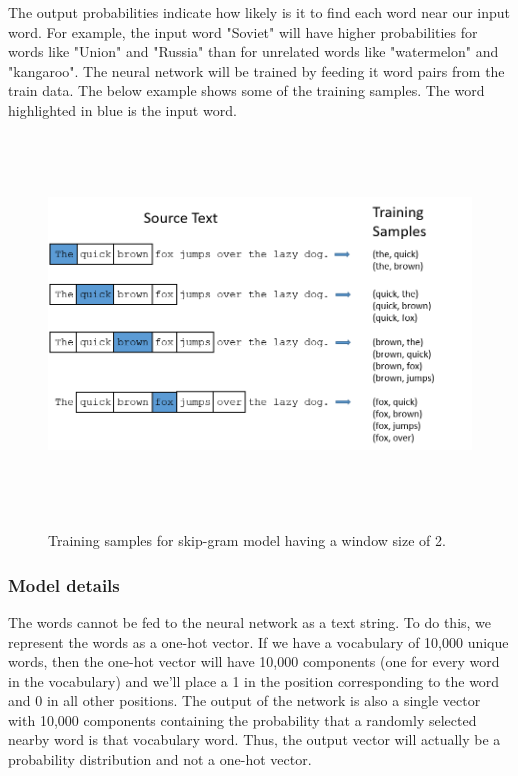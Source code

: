 The output probabilities indicate how likely is it to find each word near our input word. For example, the input word "Soviet" will have higher probabilities for words like "Union" and "Russia" than for unrelated words like "watermelon" and "kangaroo". The neural network will be trained by feeding it word pairs from the train data. The below example shows some of the training samples. The word highlighted in blue is the input word.

\begin{figure}[htbp]
\centering
\includegraphics[width=16cm, height=10cm]{images/training_data.png}\\
\centering
\caption{Training samples for skip-gram model having a window size of 2.}
\label{fig:foo}
\end{figure}

\newpage
\subsubsection{Model details}

The words cannot be fed to the neural network as a text string. To do this, we represent the words as a one-hot vector. If we have a vocabulary of 10,000 unique words, then the one-hot vector will have 10,000 components (one for every word in the vocabulary) and we'll place a 1 in the position corresponding to the word and 0 in all other positions. The output of the network is also a single vector with 10,000 components containing the probability that a randomly selected nearby word is that vocabulary word. Thus, the output vector will actually be a probability distribution and not a one-hot vector.

